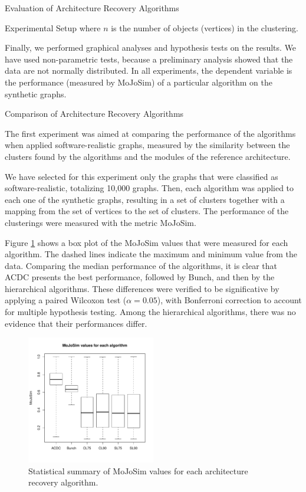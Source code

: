 \documentclass[11pt,twocolumn,a4paper,english]{article}
\begin{document}
\begin{section}{Evaluation of Architecture Recovery Algorithms}
\begin{subsection}{Experimental Setup}
	where $n$ is the number of objects (vertices) in the clustering.
	
	Finally, we performed graphical analyses and hypothesis tests on the results. We have used non-parametric tests, because a preliminary analysis showed that the data are not normally distributed. In all experiments, the dependent variable is the performance (measured by MoJoSim) of a particular algorithm on the synthetic graphs.
	
\end{subsection}

\begin{subsection}{Comparison of Architecture Recovery Algorithms} \label{sec:exp1}
	
	The first experiment was aimed at comparing the performance of the algorithms when applied software-realistic graphs, measured by the similarity between the clusters found by the algorithms and the modules of the reference architecture.
	
	We have selected for this experiment only the graphs that were classified as software-realistic, totalizing 10,000 graphs. Then, each algorithm was applied to each one of the synthetic graphs, resulting in a set of clusters together with a mapping from the set of vertices to the set of clusters. The performance of the clusterings were measured with the metric MoJoSim.
	
	Figure \ref{fig:exp-algorithms} shows a box plot of the MoJoSim values that were measured for each algorithm. The dashed lines indicate the maximum and minimum value from the data. Comparing the median performance of the algorithms, it is clear that ACDC presents the best performance, followed by Bunch, and then by the hierarchical algorithms. These differences were verified to be significative by applying a paired Wilcoxon test ($\alpha = 0.05$), with Bonferroni correction to account for multiple hypothesis testing. Among the hierarchical algorithms, there was no evidence that their performances differ.
	
	\begin{figure}[htbp]
		\centering
			\includegraphics[width=0.5\textwidth]{figures/exp-algorithms}
		\caption{Statistical summary of MoJoSim values for each architecture recovery algorithm.}
		\label{fig:exp-algorithms}
	\end{figure}
	

\end{subsection}
\end{section}
\end{document}
